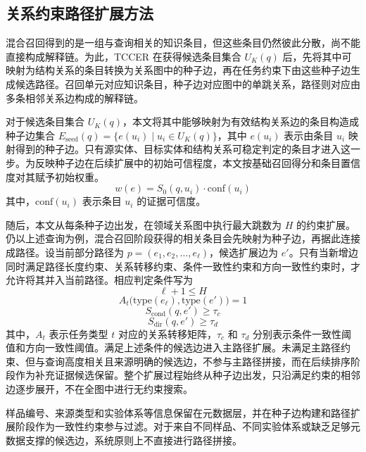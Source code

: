 \subsection{关系约束路径扩展方法}

混合召回得到的是一组与查询相关的知识条目，但这些条目仍然彼此分散，尚不能直接构成解释链。为此，TCCER 在获得候选条目集合 $U_K(q)$ 后，先将其中可映射为结构关系的条目转换为关系图中的种子边，再在任务约束下由这些种子边生成候选路径。召回单元对应知识条目，种子边对应图中的单跳关系，路径则对应由多条相邻关系边构成的解释链。

对于候选条目集合 $U_K(q)$，本文将其中能够映射为有效结构关系边的条目构造成种子边集合 $E_{\mathrm{seed}}(q)=\{e(u_i)\mid u_i\in U_K(q)\}$，其中 $e(u_i)$ 表示由条目 $u_i$ 映射得到的种子边。只有源实体、目标实体和结构关系可稳定判定的条目才进入这一步。为反映种子边在后续扩展中的初始可信程度，本文按基础召回得分和条目置信度对其赋予初始权重。
\begin{equation}
    w(e)=S_0(q,u_i)\cdot \mathrm{conf}(u_i)
\end{equation}
其中，$\mathrm{conf}(u_i)$ 表示条目 $u_i$ 的证据可信度。

随后，本文从每条种子边出发，在领域关系图中执行最大跳数为 $H$ 的约束扩展。仍以上述查询为例，混合召回阶段获得的相关条目会先映射为种子边，再据此连接成路径。设当前部分路径为 $p=(e_1,e_2,\ldots,e_{\ell})$，候选扩展边为 $e'$。只有当新增边同时满足路径长度约束、关系转移约束、条件一致性约束和方向一致性约束时，才允许将其并入当前路径。相应判定条件写为
\begin{equation}
    \ell + 1 \leq H
\end{equation}
\begin{equation}
    A_t\bigl(\mathrm{type}(e_{\ell}),\mathrm{type}(e')\bigr)=1
\end{equation}
\begin{equation}
    S_{\mathrm{cond}}(q,e') \geq \tau_c
\end{equation}
\begin{equation}
    S_{\mathrm{dir}}(q,e') \geq \tau_d
\end{equation}
其中，$A_t$ 表示任务类型 $t$ 对应的关系转移矩阵，$\tau_c$ 和 $\tau_d$ 分别表示条件一致性阈值和方向一致性阈值。满足上述条件的候选边进入主路径扩展。未满足主路径约束、但与查询高度相关且来源明确的候选边，不参与主路径拼接，而在后续排序阶段作为补充证据候选保留。整个扩展过程始终从种子边出发，只沿满足约束的相邻边逐步展开，不在全图中进行无约束搜索。

样品编号、来源类型和实验体系等信息保留在元数据层，并在种子边构建和路径扩展阶段作为一致性约束参与过滤。对于来自不同样品、不同实验体系或缺乏足够元数据支撑的候选边，系统原则上不直接进行路径拼接。

